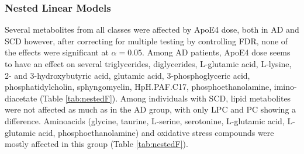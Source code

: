\documentclass{amsart}
\begin{document}
\subsubsection{Nested Linear Models}
Several metabolites from all classes were affected by ApoE4 dose, both in AD and SCD however, after correcting for multiple testing by controlling FDR, none of the effects were significant at $\alpha=0.05$. Among AD patients, ApoE4 dose seems to have an effect on several triglycerides, diglycerides, L-glutamic acid, L-lysine, 2- and 3-hydroxybutyric acid, glutamic acid, 3-phosphoglyceric acid, phosphatidylcholin, sphyngomyelin, HpH.PAF.C17, phosphoethanolamine, imino-diacetate (Table \ref{tab:nestedF}). Among individuals with SCD, lipid metabolites were not affected as much as in the AD group, with only LPC and PC showing a difference. Aminoacids (glycine, taurine, L-serine, serotonine, L-glutamic acid, L-glutamic acid, phosphoethanolamine) and oxidative stress compounds were mostly affected in this group (Table \ref{tab:nestedF}). 
\end{document}
